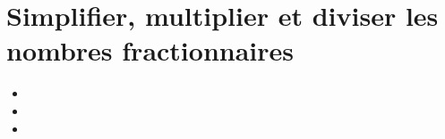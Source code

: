 \chapter{Simplifier, multiplier et diviser les nombres fractionnaires}\label{ChSimpMulDivFrac}

\vspace{5cm}
\begin{acquis}
\begin{itemize}
\item 
\item 
\item 
\end{itemize}
\end{acquis}


\activites


\cours


\exercicesbase
\begin{colonne*exercice}

\end{colonne*exercice}


\exercicesappr
\begin{colonne*exercice}

\end{colonne*exercice}

\connaissances


\TravauxPratiques


\recreation %



